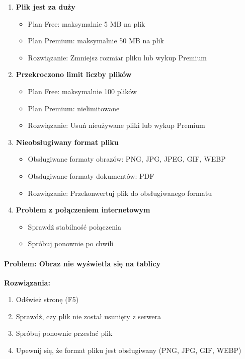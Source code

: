 \documentclass[12pt,a4paper]{article}
\begin{document}
\begin{enumerate}
    \item \textbf{Plik jest za duży}
    \begin{itemize}
        \item Plan Free: maksymalnie 5 MB na plik
        \item Plan Premium: maksymalnie 50 MB na plik
        \item Rozwiązanie: Zmniejsz rozmiar pliku lub wykup Premium
    \end{itemize}
    
    \item \textbf{Przekroczono limit liczby plików}
    \begin{itemize}
        \item Plan Free: maksymalnie 100 plików
        \item Plan Premium: nielimitowane
        \item Rozwiązanie: Usuń nieużywane pliki lub wykup Premium
    \end{itemize}
    
    \item \textbf{Nieobsługiwany format pliku}
    \begin{itemize}
        \item Obsługiwane formaty obrazów: PNG, JPG, JPEG, GIF, WEBP
        \item Obsługiwane formaty dokumentów: PDF
        \item Rozwiązanie: Przekonwertuj plik do obsługiwanego formatu
    \end{itemize}
    
    \item \textbf{Problem z połączeniem internetowym}
    \begin{itemize}
        \item Sprawdź stabilność połączenia
        \item Spróbuj ponownie po chwili
    \end{itemize}
\end{enumerate}

\paragraph{Problem: Obraz nie wyświetla się na tablicy}

\textbf{Rozwiązania:}

\begin{enumerate}
    \item Odśwież stronę (F5)
    \item Sprawdź, czy plik nie został usunięty z serwera
    \item Spróbuj ponownie przesłać plik
    \item Upewnij się, że format pliku jest obsługiwany (PNG, JPG, GIF, WEBP)
\end{enumerate}
\end{document}
